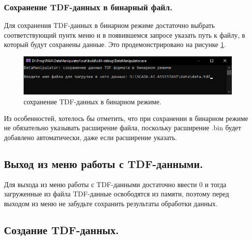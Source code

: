 \subsubsection{ \standartTitleFont
  Сохранение TDF-данных в бинарный файл.
} \label{subsubsec:TDFSafeBIN}

{\standartFont

  \par Для сохранения TDF-данных в бинарном режиме достаточно выбрать соответствующий пунтк меню и в появившемся запросе указать путь к файлу, в который будут сохранены данные. Это продемонстрировано на рисунке \ref{fig:TDFsafeBIN}.

  \begin{figure}[H]
    \centering
    \includegraphics[width=\textwidth]{images/forDataManipulator/TDFsafeBIN.png}
    \caption{сохранение TDF-данных в бинарном режиме.} 
    \label{fig:TDFsafeBIN}
  \end{figure}

  \par Из особенностей, хотелось бы отметить, что при сохранении в бинарном режиме не обязательно указывать расширение файла, поскольку расширение .bin будет добавлено автоматически, даже если расширение указать. 
}

\subsection{ \standartTitleFont
  Выход из меню работы с TDF-данными.
} \label{subsubsec:TDFOut}

{\standartFont

  \par Для выхода из меню работы с TDF-данными достаточно ввести 0 и тогда загруженные из файла TDF-данные освободятся из памяти, поэтому перед выходом из меню не забудьте сохранить результаты обработки данных. 

  \par
}

\subsection{ \standartTitleFont
  Создание TDF-данных.
} \label{subsubsec:CreateTDF}

